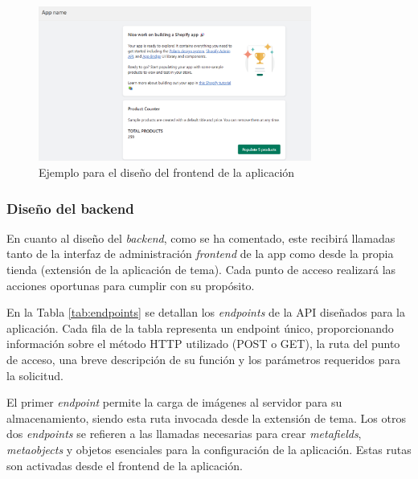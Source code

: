 \documentclass[11pt]{article}
\begin{document}
\begin{figure}[H]
    \centering
    \includegraphics[width=0.8\textwidth]{imagenes-diseño/diseñoFrontend.png}
    \caption{\label{fig:disenoFront}Ejemplo para el diseño del frontend de la aplicación}
    \vspace{\fill}
\end{figure}

\subsubsection{Diseño del backend} \label{subsec:diseno-backend}
En cuanto al diseño del \textit{backend}, como se ha comentado, este recibirá llamadas tanto de la interfaz de administración {\textit{frontend} de la app} como
desde la propia tienda (extensión de la aplicación de tema). Cada punto de acceso realizará las acciones oportunas para cumplir con su propósito.

En la Tabla \ref{tab:endpoints} se detallan los \textit{endpoints} de la API diseñados para la aplicación. 
Cada fila de la tabla representa un endpoint único, proporcionando información sobre el método HTTP 
utilizado (POST o GET), la ruta del punto de acceso, una breve descripción de su función y los parámetros 
requeridos para la solicitud.

El primer \textit{endpoint} permite la carga de imágenes al servidor para su almacenamiento, siendo esta ruta invocada 
desde la extensión de tema. Los otros dos \textit{endpoints} se refieren a las llamadas necesarias para crear \textit{metafields}, 
\textit{metaobjects} y objetos esenciales para la configuración de la aplicación. Estas rutas son activadas desde el frontend de la aplicación.
\end{document}
